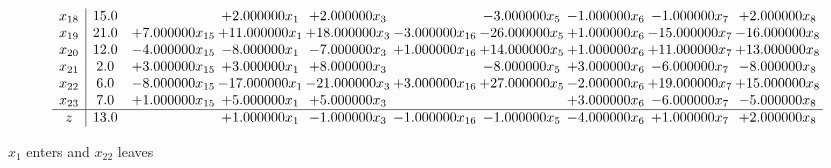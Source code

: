 \documentclass[10pt]{article}
\begin{document}
\[\begin{array}{c| c c@{\hskip 2pt} c@{\hskip 2pt} c@{\hskip 2pt} c@{\hskip 2pt} c@{\hskip 2pt} c@{\hskip 2pt} c@{\hskip 2pt} c@{\hskip 2pt} }
 x_{18}   &  15.0  &   & + 2.000000 x_{1} & + 2.000000 x_{3} &   & -3.000000 x_{5} & -1.000000 x_{6} & -1.000000 x_{7} & + 2.000000 x_{8}\\
 x_{19}   &  21.0 & + 7.000000 x_{15} & + 11.000000 x_{1} & + 18.000000 x_{3} & -3.000000 x_{16} & -26.000000 x_{5} & + 1.000000 x_{6} & -15.000000 x_{7} & -16.000000 x_{8}\\
 x_{20}   &  12.0 & -4.000000 x_{15} & -8.000000 x_{1} & -7.000000 x_{3} & + 1.000000 x_{16} & + 14.000000 x_{5} & + 1.000000 x_{6} & + 11.000000 x_{7} & + 13.000000 x_{8}\\
 x_{21}   &  2.0 & + 3.000000 x_{15} & + 3.000000 x_{1} & + 8.000000 x_{3} &   & -8.000000 x_{5} & + 3.000000 x_{6} & -6.000000 x_{7} & -8.000000 x_{8}\\
 x_{22}   &  6.0 & -8.000000 x_{15} & -17.000000 x_{1} & -21.000000 x_{3} & + 3.000000 x_{16} & + 27.000000 x_{5} & -2.000000 x_{6} & + 19.000000 x_{7} & + 15.000000 x_{8}\\
 x_{23}   &  7.0 & + 1.000000 x_{15} & + 5.000000 x_{1} & + 5.000000 x_{3} &    &   & + 3.000000 x_{6} & -6.000000 x_{7} & -5.000000 x_{8}\\
\hline
z    &  13.0  &   & + 1.000000 x_{1} & -1.000000 x_{3} & -1.000000 x_{16} & -1.000000 x_{5} & -4.000000 x_{6} & + 1.000000 x_{7} & + 2.000000 x_{8}\\
\end{array}\]


 $ x_{1} $ enters and $ x_{22} $ leaves 
\end{document}
